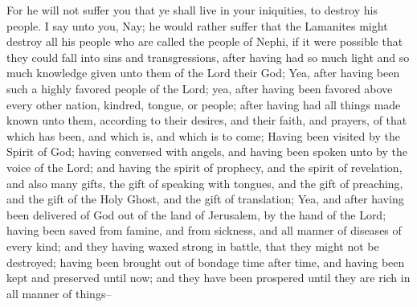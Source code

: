 For he will not suffer you that ye shall live in your iniquities, to destroy his people. I say unto you, Nay; he would rather suffer that the Lamanites might destroy all his people who are called the people of Nephi, if it were possible that they could fall into sins and transgressions, after having had so much light and so much knowledge given unto them of the Lord their God;
\bverse \iffalse Yea, after having been such a highly favored people of the Lord; yea, after having been favored above every other nation, kindred, tongue, or people; after having had all things made known unto them, according to their desires, and their faith, and prayers, of that which has been, and which is, and which is to come; \fi
Yea, after having been such a highly favored people of the Lord; yea, after having been favored above every other nation, kindred, tongue, or people; after having had all things made known unto them, according to their desires, and their faith, and prayers, of that which has been, and which is, and which is to come;
\bverse \iffalse Having been visited by the Spirit of God; having conversed with angels, and having been spoken unto by the voice of the Lord; and having the spirit of prophecy, and the spirit of revelation, and also many gifts, the gift of speaking with tongues, and the gift of preaching, and the gift of the Holy Ghost, and the gift of translation; \fi
Having been visited by the Spirit of God; having conversed with angels, and having been spoken unto by the voice of the Lord; and having the spirit of prophecy, and the spirit of revelation, and also many gifts, the gift of speaking with tongues, and the gift of preaching, and the gift of the Holy Ghost, and the gift of translation;
\bverse \iffalse Yea, and after having been delivered of God out of the land of Jerusalem, by the hand of the Lord; having been saved from famine, and from sickness, and all manner of diseases of every kind; and they having waxed strong in battle, that they might not be destroyed; having been brought out of bondage time after time, and having been kept and preserved until now; and they have been prospered until they are rich in all manner of things-- \fi
Yea, and after having been delivered of God out of the land of Jerusalem, by the hand of the Lord; having been saved from famine, and from sickness, and all manner of diseases of every kind; and they having waxed strong in battle, that they might not be destroyed; having been brought out of bondage time after time, and having been kept and preserved until now; and they have been prospered until they are rich in all manner of things--
